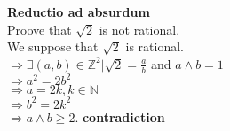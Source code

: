 \documentclass{article}
\begin{document}
\noindent \textbf{Reductio ad absurdum}\\
\noindent Proove that $\sqrt{2}$ is not rational.\\
We suppose that $\sqrt{2}$ is rational.\\
$\Rightarrow \exists (a, b) \in \mathbb{Z}^2 | \sqrt{2} = \frac{a}{b}$
and $a \land b = 1$\\
$\Rightarrow a^2 = 2b^2$\\
$\Rightarrow a = 2k , k \in \mathbb{N}$\\ 
$\Rightarrow b^2 = 2k^2$\\
$\Rightarrow a \land b \geq 2$. \textbf{contradiction}\\\
\end{document}
